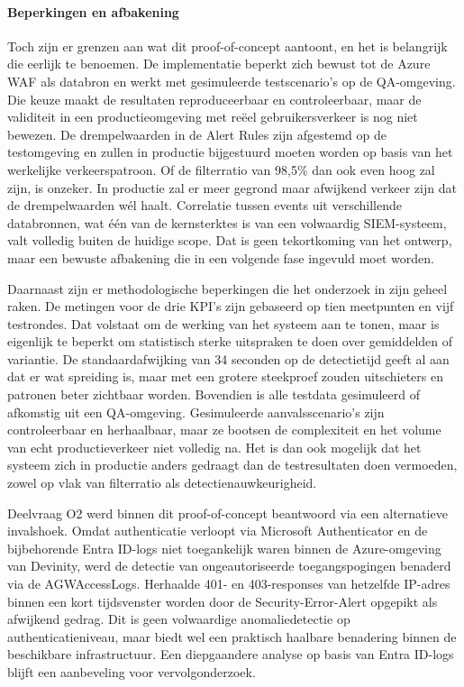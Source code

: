 \paragraph{Beperkingen en afbakening}
Toch zijn er grenzen aan wat dit proof-of-concept aantoont, en het is belangrijk die eerlijk te benoemen. De implementatie beperkt zich bewust tot de Azure WAF als databron en werkt met gesimuleerde testscenario's op de QA-omgeving. Die keuze maakt de resultaten reproduceerbaar en controleerbaar, maar de validiteit in een productieomgeving met reëel gebruikersverkeer is nog niet bewezen. De drempelwaarden in de Alert Rules zijn afgestemd op de testomgeving en zullen in productie bijgestuurd moeten worden op basis van het werkelijke verkeerspatroon. Of de filterratio van 98,5\% dan ook even hoog zal zijn, is onzeker. In productie zal er meer gegrond maar afwijkend verkeer zijn dat de drempelwaarden wél haalt. Correlatie tussen events uit verschillende databronnen, wat één van de kernsterktes is van een volwaardig SIEM-systeem, valt volledig buiten de huidige scope. Dat is geen tekortkoming van het ontwerp, maar een bewuste afbakening die in een volgende fase ingevuld moet worden.

Daarnaast zijn er methodologische beperkingen die het onderzoek in zijn geheel raken. De metingen voor de drie KPI's zijn gebaseerd op tien meetpunten en vijf testrondes. Dat volstaat om de werking van het systeem aan te tonen, maar is eigenlijk te beperkt om statistisch sterke uitspraken te doen over gemiddelden of variantie. De standaardafwijking van 34 seconden op de detectietijd geeft al aan dat er wat spreiding is, maar met een grotere steekproef zouden uitschieters en patronen beter zichtbaar worden. Bovendien is alle testdata gesimuleerd of afkomstig uit een QA-omgeving. Gesimuleerde aanvalsscenario's zijn controleerbaar en herhaalbaar, maar ze bootsen de complexiteit en het volume van echt productieverkeer niet volledig na. Het is dan ook mogelijk dat het systeem zich in productie anders gedraagt dan de testresultaten doen vermoeden, zowel op vlak van filterratio als detectienauwkeurigheid.

Deelvraag O2 werd binnen dit proof-of-concept beantwoord via een alternatieve invalshoek. Omdat authenticatie verloopt via Microsoft Authenticator en de bijbehorende Entra ID-logs niet toegankelijk waren binnen de Azure-omgeving van Devinity, werd de detectie van ongeautoriseerde toegangspogingen benaderd via de AGWAccessLogs. Herhaalde 401- en 403-responses van hetzelfde IP-adres binnen een kort tijdsvenster worden door de Security-Error-Alert opgepikt als afwijkend gedrag. Dit is geen volwaardige anomaliedetectie op authenticatieniveau, maar biedt wel een praktisch haalbare benadering binnen de beschikbare infrastructuur. Een diepgaandere analyse op basis van Entra ID-logs blijft een aanbeveling voor vervolgonderzoek.


